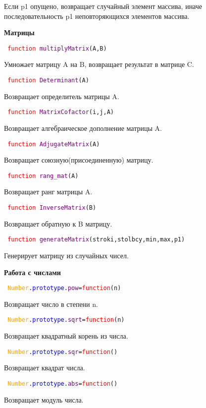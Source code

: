 Если p1 опущено, возвращает случайный элемент массива, иначе последовательность p1 неповторяющихся элементов массива.

\textbf{Матрицы}

\texttt{
	\textcolor{Red}{function} \textcolor{Purple}{multiplyMatrix}(A,B)
}

Умножает матрицу A на B, возвращает результат в матрице C.

\texttt{
	\textcolor{Red}{function} \textcolor{Purple}{Determinant}(A)
}

Возвращает определитель матрицы A.

\texttt{
	\textcolor{Red}{function} \textcolor{Purple}{MatrixCofactor}(i,j,A)
}

Возвращает алгебраическое дополнение матрицы A.

\texttt{
	\textcolor{Red}{function} \textcolor{Purple}{AdjugateMatrix}(A)
}

Возвращает союзную(присоединенную) матрицу.

\texttt{
	\textcolor{Red}{function} \textcolor{Purple}{rang\_mat}(А)
}

Возвращает ранг матрицы A.

\texttt{
	\textcolor{Red}{function} \textcolor{Purple}{InverseMatrix}(B)
}

Возвращает обратную  к B матрицу.

\texttt{
	\textcolor{Red}{function} \textcolor{Purple}{generateMatrix}(stroki,stolbcy,min,max,p1)
}

Генерирует матрицу из случайных чисел.

\textbf{Работа с числами}

\texttt{
	\textcolor{Orange}{Number}.\textcolor{Blue}{prototype}.\textcolor{Purple}{pow}=\textcolor{Red}{function}(n)
}

Возвращает число в степени n.

\texttt{
	\textcolor{Orange}{Number}.\textcolor{Blue}{prototype}.\textcolor{Purple}{sqrt}=\textcolor{Red}{function}(n)
}

Возвращает квадратный корень из числа.

\texttt{
	\textcolor{Orange}{Number}.\textcolor{Blue}{prototype}.\textcolor{Purple}{sqr}=\textcolor{Red}{function}()
}

Возвращает квадрат числа.

\texttt{
	\textcolor{Orange}{Number}.\textcolor{Blue}{prototype}.\textcolor{Purple}{abs}=\textcolor{Red}{function}()
}

Возвращает модуль числа.

